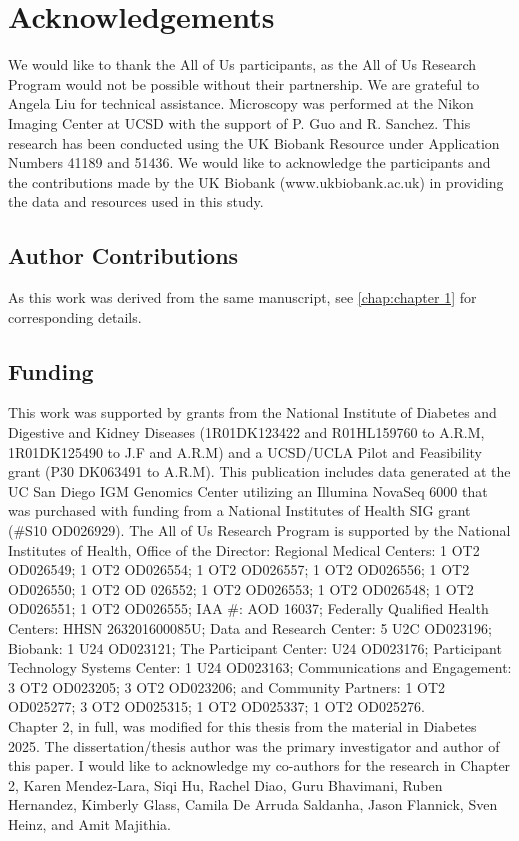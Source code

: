 \section{Acknowledgements}
We would like to thank the All of Us participants, as the All of Us Research Program would not be possible without their partnership. We are grateful to Angela Liu for technical assistance. Microscopy was performed at the Nikon Imaging Center at UCSD with the support of P. Guo and R. Sanchez. This research has been conducted using the UK Biobank Resource under Application Numbers 41189 and 51436. We would like to acknowledge the participants and the contributions made by the UK Biobank (www.ukbiobank.ac.uk) in providing the data and resources used in this study.  

\subsection{Author Contributions}
As this work was derived from the same manuscript, see \ref{chap:chapter 1} for corresponding details.

\subsection{Funding}
This work was supported by grants from the National Institute of Diabetes and Digestive and Kidney Diseases (1R01DK123422 and R01HL159760 to A.R.M, 1R01DK125490 to J.F and A.R.M) and a UCSD/UCLA Pilot and Feasibility grant (P30 DK063491 to A.R.M). This publication includes data generated at the UC San Diego IGM Genomics Center utilizing an Illumina NovaSeq 6000 that was purchased with funding from a National Institutes of Health SIG grant (\#S10 OD026929). The All of Us Research Program is supported by the National Institutes of Health, Office of the Director: Regional Medical Centers: 1 OT2 OD026549; 1 OT2 OD026554; 1 OT2 OD026557; 1 OT2 OD026556; 1 OT2 OD026550; 1 OT2 OD 026552; 1 OT2 OD026553; 1 OT2 OD026548; 1 OT2 OD026551; 1 OT2 OD026555; IAA \#: AOD 16037; Federally Qualified Health Centers: HHSN 263201600085U; Data and Research Center: 5 U2C OD023196; Biobank: 1 U24 OD023121; The Participant Center: U24 OD023176; Participant Technology Systems Center: 1 U24 OD023163; Communications and Engagement: 3 OT2 OD023205; 3 OT2 OD023206; and Community Partners: 1 OT2 OD025277; 3 OT2 OD025315; 1 OT2 OD025337; 1 OT2 OD025276.
\\

\noindent Chapter 2, in full, was modified for this thesis from the material in Diabetes 2025. The dissertation/thesis author was the primary investigator and author of this paper. I would like to acknowledge my co-authors for the research in Chapter 2, Karen Mendez-Lara, Siqi Hu, Rachel Diao, Guru Bhavimani, Ruben Hernandez, Kimberly Glass, Camila De Arruda Saldanha, Jason Flannick, Sven Heinz, and Amit Majithia.


